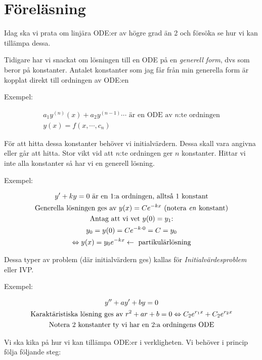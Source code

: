\section{Föreläsning}

\noindent Idag ska vi prata om linjära ODE:er av högre grad än 2 och försöka se hur vi kan tillämpa dessa.
\par\bigskip
\noindent Tidigare har vi snackat om lösningen till en ODE på en \textit{generell form}, dvs som beror på konstanter. Antalet konstanter som jag får från min generella form är kopplat direkt till ordningen av ODE:en
\par\bigskip
\noindent Exempel:


\begin{equation*}
  \begin{gathered}
    a_1y^{(n)}(x)+a_2y^{(n-1)}\cdots \text{ är en ODE av $n$:te ordningen}\\
    y(x) = f(x,\cdots, c_n)
  \end{gathered}
\end{equation*}
\par\bigskip
\noindent För att hitta dessa konstanter behöver vi initialvärdern. Dessa skall vara angivna eller går att hitta. Stor vikt vid att $n$:te ordningen ger $n$ konstanter. Hittar vi inte alla konstanter så har vi en generell lösning.
\par\bigskip
\noindent Exempel:


\begin{equation*}
  \begin{gathered}
    y^{\prime}+ky = 0 \text{ är en 1:a ordningen, alltså 1 konstant}\\
    \text{Generella lösningen ges av } y(x) = Ce^{-kx} \text{ (notera \textit{en} konstant)}\\
    \text{Antag att vi vet $y(0)=y_1$:}\\
    y_0 = y(0) = Ce^{-k\cdot0} = C = y_0\\
    \Leftrightarrow y(x) = y_0e^{-kx} \leftarrow\text{  partikulärlösning}
  \end{gathered}
\end{equation*}
\par\bigskip
\noindent Dessa typer av problem (där initialvärdern ges) kallas för \textit{Initialvärdesproblem} eller IVP.
\par\bigskip
\noindent Exempel:


\begin{equation*}
  \begin{gathered}
    y^{\prime\prime}+ay^{\prime}+by=0\\
    \text{Karaktäristiska lösning ges av } r^2+ar+b=0 \Leftrightarrow C_2e^{r_1x}+C_2e^{r_2x}\\
    \text{Notera 2 konstanter ty vi har en 2:a ordningens ODE}
  \end{gathered}
\end{equation*}
\par\bigskip
\noindent Vi ska kika på hur vi kan tillämpa ODE:er i verkligheten. Vi behöver i princip följa följande steg:

